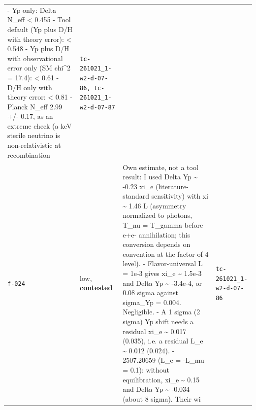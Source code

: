 \documentclass[11pt,a4paper]{article}
\begin{document}
\begin{longtable}{@{}p{}p{}p{}p{}@{}}
- Yp only: Delta N\_eff \textless{} 0.455
- Tool default (Yp plus D/H with theory error): \textless{} 0.548
- Yp plus D/H with observational error only (SM chi\textasciicircum{}2 = 17.4): \textless{} 0.61
- D/H only with theory error: \textless{} 0.81
- Planck N\_eff 2.99 +/- 0.17, as an extreme check (a keV sterile neutrino is non-relativistic at recombination & \texttt{tc-261021\_\allowbreak{}1-w2-d-07-86,\allowbreak{} tc-261021\_\allowbreak{}1-w2-d-07-87} \\
\texttt{f-024} & low, \textbf{contested} & Own estimate, not a tool result: I used Delta Yp \textasciitilde{} -0.23 xi\_e (literature-standard sensitivity) with xi \textasciitilde{} 1.46 L (asymmetry normalized to photons, T\_nu = T\_gamma before e+e- annihilation; this conversion depends on convention at the factor-of-4 level).
- Flavor-universal L = 1e-3 gives xi\_e \textasciitilde{} 1.5e-3 and Delta Yp \textasciitilde{} -3.4e-4, or 0.08 sigma against sigma\_Yp = 0.004. Negligible.
- A 1 sigma (2 sigma) Yp shift needs a residual xi\_e \textasciitilde{} 0.017 (0.035), i.e. a residual L\_e \textasciitilde{} 0.012 (0.024).
- 2507.20659 (L\_e = -L\_mu = 0.1): without equilibration, xi\_e \textasciitilde{} 0.15 and Delta Yp \textasciitilde{} -0.034 (about 8 sigma). Their wi & \texttt{tc-261021\_\allowbreak{}1-w2-d-07-86} \\
\bottomrule\end{longtable}
\end{document}
